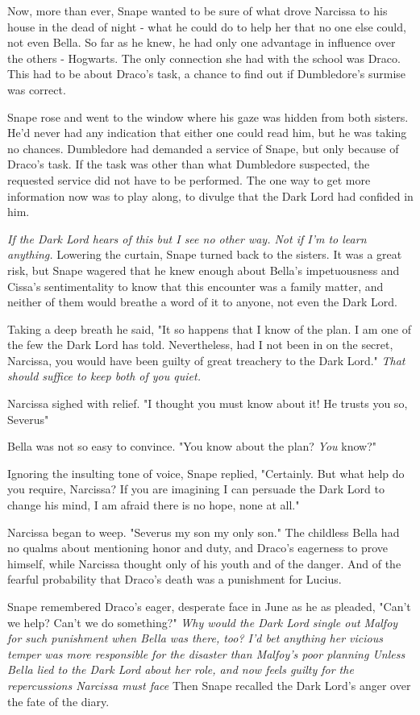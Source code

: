 Now, more than ever, Snape wanted to be sure of what drove Narcissa to his house in the dead of night - what he could do to help her that no one else could, not even Bella. So far as he knew, he had only one advantage in influence over the others - Hogwarts. The only connection she had with the school was Draco. This had to be about Draco's task, a chance to find out if Dumbledore's surmise was correct.

Snape rose and went to the window where his gaze was hidden from both sisters. He'd never had any indication that either one could read him, but he was taking no chances. Dumbledore had demanded a service of Snape, but only because of Draco's task. If the task was other than what Dumbledore suspected, the requested service did not have to be performed. The one way to get more information now was to play along, to divulge that the Dark Lord had confided in him.

\emph{If the Dark Lord hears of this{\el} but I see no other way. Not if I'm to learn anything.} Lowering the curtain, Snape turned back to the sisters. It was a great risk, but Snape wagered that he knew enough about Bella's impetuousness and Cissa's sentimentality to know that this encounter was a family matter, and neither of them would breathe a word of it to anyone, not even the Dark Lord.

Taking a deep breath he said, "It so happens that I know of the plan. I am one of the few the Dark Lord has told. Nevertheless, had I not been in on the secret, Narcissa, you would have been guilty of great treachery to the Dark Lord." \emph{That should suffice to keep both of you quiet.}

Narcissa sighed with relief. "I thought you must know about it! He trusts you so, Severus{\el}"

Bella was not so easy to convince. "You know about the plan? \emph{You} know?"

Ignoring the insulting tone of voice, Snape replied, "Certainly. But what help do you require, Narcissa? If you are imagining I can persuade the Dark Lord to change his mind, I am afraid there is no hope, none at all."

Narcissa began to weep. "Severus{\el} my son{\el} my only son." The childless Bella had no qualms about mentioning honor and duty, and Draco's eagerness to prove himself, while Narcissa thought only of his youth and of the danger. And of the fearful probability that Draco's death was a punishment for Lucius.

Snape remembered Draco's eager, desperate face in June as he as pleaded, "Can't we help? Can't we do something?" \emph{Why would the Dark Lord single out Malfoy for such punishment when Bella was there, too? I'd bet anything her vicious temper was more responsible for the disaster than Malfoy's poor planning{\el} Unless Bella lied to the Dark Lord about her role, and now feels guilty for the repercussions Narcissa must face{\el}} Then Snape recalled the Dark Lord's anger over the fate of the diary.

